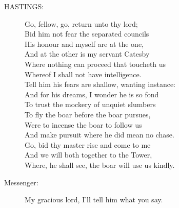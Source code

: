 \documentclass{article}
\begin{document}
\begin{description}
\item[HASTINGS:] 
\hspace{1pt}Go, fellow, go, return unto thy lord;\\
\hspace{1pt}Bid him not fear the separated councils\\
\hspace{1pt}His honour and myself are at the one,\\
\hspace{1pt}And at the other is my servant Catesby\\
\hspace{1pt}Where nothing can proceed that toucheth us\\
\hspace{1pt}Whereof I shall not have intelligence.\\
\hspace{1pt}Tell him his fears are shallow, wanting instance:\\
\hspace{1pt}And for his dreams, I wonder he is so fond\\
\hspace{1pt}To trust the mockery of unquiet slumbers\\
\hspace{1pt}To fly the boar before the boar pursues,\\
\hspace{1pt}Were to incense the boar to follow us\\
\hspace{1pt}And make pursuit where he did mean no chase.\\
\hspace{1pt}Go, bid thy master rise and come to me\\
\hspace{1pt}And we will both together to the Tower,\\
\hspace{1pt}Where, he shall see, the boar will use us kindly.\\
\end{description}
\begin{description}
\item[Messenger:] 
\hspace{1pt}My gracious lord, I'll tell him what you say.\\
\end{description}
\centering{\it [Exit]}\\
\\
\end{document}
